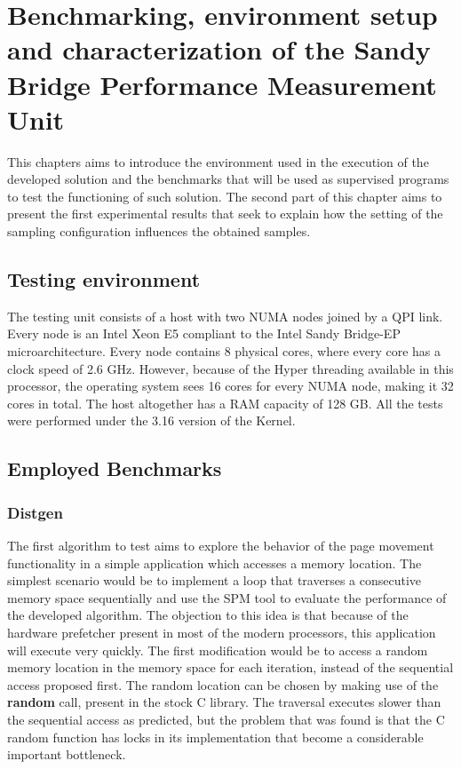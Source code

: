 \chapter{Benchmarking, environment setup and characterization of the Sandy Bridge Performance Measurement Unit}\label{chapter:envsetup}

This chapters aims to introduce the environment used in the execution of the developed solution and the benchmarks that will be used as supervised programs to test the functioning of such solution. The second part of this chapter aims to present the first experimental results that seek to explain how the setting of the sampling configuration influences the obtained samples.

\section{Testing environment}\label{section:runningenv}
The testing unit consists of a host with two NUMA nodes joined by a QPI link. Every node is an Intel Xeon E5 compliant to the Intel Sandy Bridge-EP microarchitecture. Every node contains 8 physical cores, where every core has a clock speed of 2.6 GHz. However, because of the Hyper threading available in this processor, the operating system sees 16 cores for every NUMA node, making it 32 cores in total. The host altogether has a RAM capacity of 128 GB. All the tests were performed under the 3.16 version of the Kernel.

\section{Employed Benchmarks}\label{section:emplybmchs}

\subsection{Distgen}\label{section:distgen}
The first algorithm to test aims to explore the behavior of the page movement functionality in a simple application which accesses a memory location. The simplest scenario would be to implement a loop that traverses a consecutive memory space sequentially and use the SPM tool to evaluate the performance of the developed algorithm. The objection to this idea is that because of the hardware prefetcher present in most of the modern processors, this application will execute very quickly. The first modification would be to access a random memory location in the memory space for each iteration, instead of the sequential access proposed first. The random location can be chosen by making use of the \textbf{random} call, present in the stock C library. The traversal executes slower than the sequential access as predicted, but the problem that was found is that the C random function has locks in its implementation that become a considerable important bottleneck.


